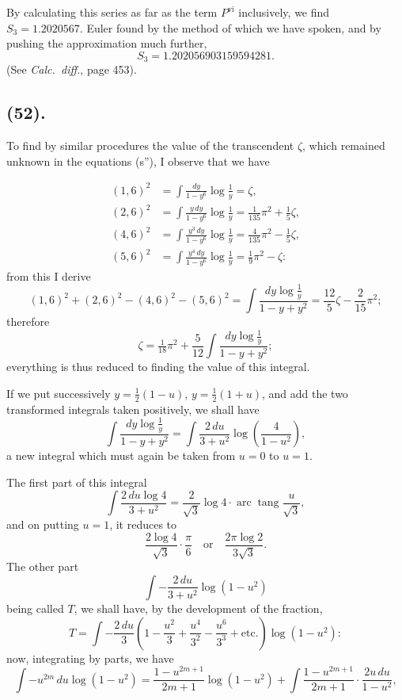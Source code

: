 \documentclass{article}
\begin{document}
By calculating this series as far as the term $P^{\text{vi}}$ inclusively, we find $S_{3}=1.2020567$. Euler found by the method of which we have spoken, and by pushing the approximation much further,
\[ S_{3}=1.202056903159594281. \]
(See \emph{Calc.\ diff.}, page 453).

\subsection*{(52).}

To find by similar procedures the value of the transcendent $\zeta$, which remained unknown in the equations (s''), I observe that we have

\[ \begin{aligned} (1,6)^{2}&=\int\frac{dy}{1-y^{6}}\log\frac{1}{y}=\zeta,\\ (2,6)^{2}&=\int\frac{y\,dy}{1-y^{6}}\log\frac{1}{y}=\tfrac{1}{135}\pi^{2}+\tfrac{1}{5}\zeta,\\ (4,6)^{2}&=\int\frac{y^{3}\,dy}{1-y^{6}}\log\frac{1}{y}=\tfrac{4}{135}\pi^{2}-\tfrac{1}{5}\zeta,\\ (5,6)^{2}&=\int\frac{y^{4}\,dy}{1-y^{6}}\log\frac{1}{y}=\tfrac{1}{9}\pi^{2}-\zeta: \end{aligned} \]
from this I derive
\[ (1,6)^{2}+(2,6)^{2}-(4,6)^{2}-(5,6)^{2}=\int\frac{dy\log\frac{1}{y}}{1-y+y^{2}}=\frac{12}{5}\zeta-\frac{2}{15}\pi^{2}; \]
therefore
\[ \zeta=\tfrac{1}{18}\pi^{2}+\frac{5}{12}\int\frac{dy\log\frac{1}{y}}{1-y+y^{2}}; \]
everything is thus reduced to finding the value of this integral.

If we put successively $y=\frac{1}{2}(1-u)$, $y=\frac{1}{2}(1+u)$, and add the two transformed integrals taken positively, we shall have
\[ \int\frac{dy\log\frac{1}{y}}{1-y+y^{2}}=\int\frac{2\,du}{3+u^{2}}\log\left(\frac{4}{1-u^{2}}\right), \]
a new integral which must again be taken from $u=0$ to $u=1$.

The first part of this integral
\[ \int\frac{2\,du\log 4}{3+u^{2}}=\frac{2}{\sqrt{3}}\log 4\cdot\operatorname{arc}\operatorname{tang}\frac{u}{\sqrt{3}}, \]
and on putting $u=1$, it reduces to
\[ \frac{2\log 4}{\sqrt{3}}\cdot\frac{\pi}{6}\quad\text{or}\quad\frac{2\pi\log 2}{3\sqrt{3}}. \]
The other part
\[ \int-\frac{2\,du}{3+u^{2}}\log(1-u^{2}) \]
being called $T$, we shall have, by the development of the fraction,
\[ T=\int-\frac{2\,du}{3}\left(1-\frac{u^{2}}{3}+\frac{u^{4}}{3^{2}}-\frac{u^{6}}{3^{3}}+\text{etc.}\right)\log(1-u^{2}): \]
now, integrating by parts, we have
\[ \int-u^{2m}\,du\log(1-u^{2})=\frac{1-u^{2m+1}}{2m+1}\log(1-u^{2})+\int\frac{1-u^{2m+1}}{2m+1}\cdot\frac{2u\,du}{1-u^{2}}, \]
\end{document}
